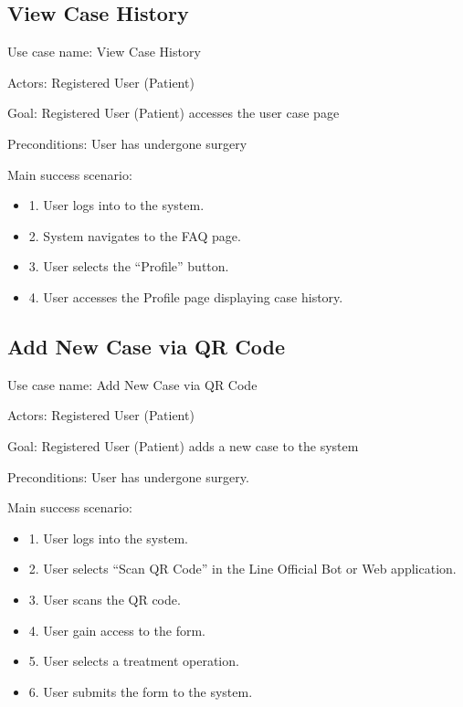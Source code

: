 \documentclass[12pt,oneside,openright,a4paper]{cpe-english-project}
\begin{document}
      \subsection{View Case History}
        \qquad Use case name: View Case History \par
        \qquad Actors: Registered User (Patient) \par
        \qquad Goal: Registered User (Patient) accesses the user case page \par
        \qquad Preconditions: User has undergone surgery \par
        \qquad Main success scenario:
        \begin{itemize}
          \item[] 1. User logs into to the system.
          \item[] 2. System navigates to the FAQ page.
          \item[] 3. User selects the “Profile” button.
          \item[] 4. User accesses the Profile page displaying case history.
        \end{itemize}

      \subsection{Add New Case via QR Code}
        \qquad Use case name: Add New Case via QR Code \par
        \qquad Actors: Registered User (Patient) \par
        \qquad Goal: Registered User (Patient) adds a new case to the system\par
        \qquad Preconditions: User has undergone surgery. \par
        \qquad Main success scenario:
        \begin{itemize}
          \item[] 1. User logs into the system.
          \item[] 2. User selects “Scan QR Code” in the Line Official Bot or Web application.
          \item[] 3. User scans the QR code.
          \item[] 4. User gain access to the form.
          \item[] 5. User selects a treatment operation.
          \item[] 6. User submits the form to the system.
        \end{itemize}
\end{document}
